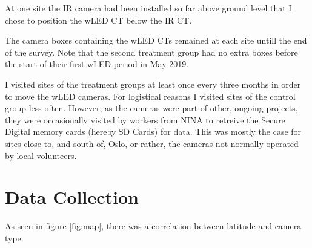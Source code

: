  
At one site the IR camera had been installed so far above ground level that I chose to position the wLED CT below the IR CT. %

The camera boxes containing the wLED CTs remained at each site untill the end of the survey. Note that the second treatment group had no extra boxes  before the start of their first wLED period in May 2019.   





I visited sites of the treatment groups at least once every three months in order to move the wLED cameras.
For logistical reasons I visited sites of the control group less often.
However, as the cameras were part of other, ongoing projects, they were occasionally visited by workers from NINA to retreive the Secure Digital memory cards (hereby SD Cards) for data. %
This was mostly the case for sites close to, and south of, Oslo, or rather, the cameras not normally operated by local volunteers.








\section{Data Collection} 


%



As seen in figure \ref{fig:map}, %
there was a correlation between latitude and camera type.

